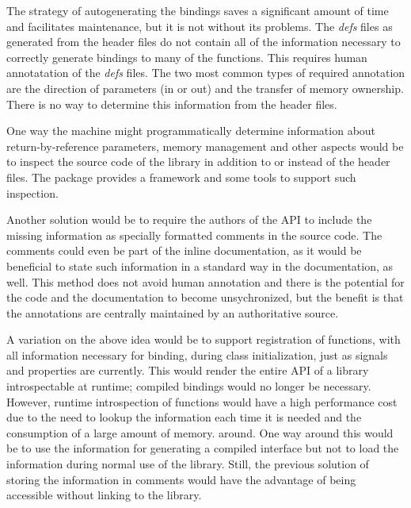 \documentclass[article]{jss}
\begin{document}
The strategy of autogenerating the bindings saves a significant amount
of time and facilitates maintenance, but it is not without its
problems.
The \emph{defs} files as generated from the header files do not
contain all
of the information necessary to correctly generate bindings to many
of the  functions. This requires human annotatation of the
\emph{defs}
files.  The two most common types of required annotation are the
direction
of parameters (in or out) and the transfer of memory ownership. There
is no
way to determine this information from the header files. 

One way the machine might programmatically determine information about
return-by-reference parameters, memory management and other aspects
would be to inspect the  source code of the library in
addition to
or instead of the header files. The  package
\citep*{RGCCTU}
provides a framework and some tools to support such inspection.

Another solution would be to require the authors of the API to include
the missing information as specially formatted comments in the source
code. The comments could even be part of the inline documentation, as
it would be beneficial to state such information in a standard way in
the documentation, as well. This method does not avoid human
annotation and there is the potential for the code and the
documentation to become unsychronized, but the benefit is that the
annotations are centrally maintained by an authoritative source.

A variation on the above idea would be to support registration of
functions, with all information necessary for binding, during class 
initialization, just as signals and properties are currently. This
would render
the entire API of a library introspectable at runtime; compiled
bindings would
no longer be necessary. However, runtime introspection of functions
would
have a high performance cost due to the need to lookup the information
each time it is needed and the consumption of a large amount of memory.  
around.
One way around this would be to use the information for generating a compiled interface but not to load the information during normal use of the library. Still, the previous solution of storing
the information in comments would have the advantage of being
accessible
without linking to the library.
\end{document}

